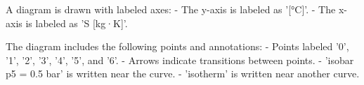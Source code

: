 A diagram is drawn with labeled axes:  
- The y-axis is labeled as '[°C]'.  
- The x-axis is labeled as 'S [kg·K]'.  

The diagram includes the following points and annotations:  
- Points labeled '0', '1', '2', '3', '4', '5', and '6'.  
- Arrows indicate transitions between points.  
- 'isobar p5 = 0.5 bar' is written near the curve.  
- 'isotherm' is written near another curve.